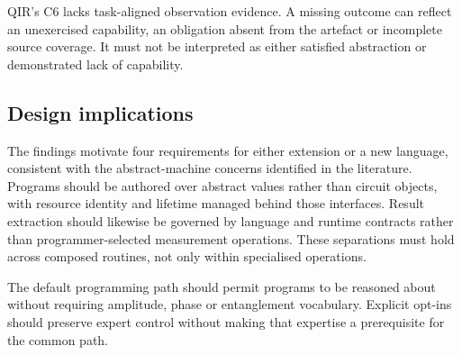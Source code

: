 QIR's C6 lacks task-aligned observation evidence.
A missing outcome can reflect an unexercised capability, an obligation absent from the artefact or incomplete source coverage.
It must not be interpreted as either satisfied abstraction or demonstrated lack of capability.

\subsection{Design implications}\label{subsec:discussion:implications}
The findings motivate four requirements for either extension or a new language, consistent with the abstract-machine concerns identified in the literature.
Programs should be authored over abstract values rather than circuit objects, with resource identity and lifetime managed behind those interfaces.
Result extraction should likewise be governed by language and runtime contracts rather than programmer-selected measurement operations.
These separations must hold across composed routines, not only within specialised operations.

The default programming path should permit programs to be reasoned about without requiring amplitude, phase or entanglement vocabulary.
Explicit opt-ins should preserve expert control without making that expertise a prerequisite for the common path.